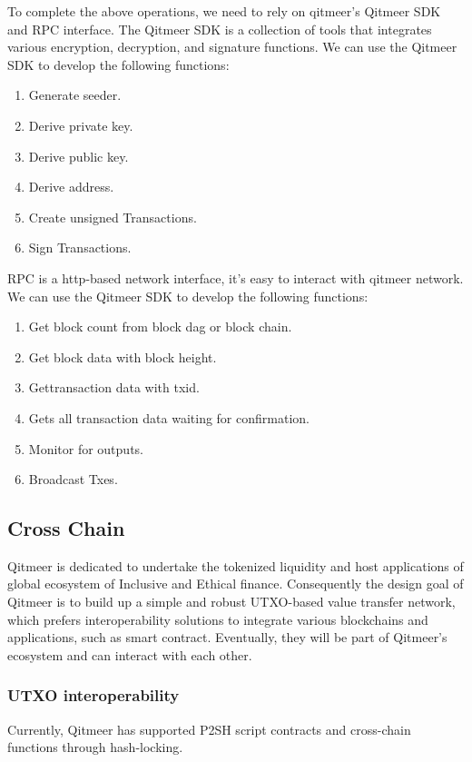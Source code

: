 \documentclass[a4paper,11pt]{article}
\begin{document}
   To complete the above operations, we need to rely on qitmeer's Qitmeer SDK and RPC interface.
   The Qitmeer SDK is a collection of tools that integrates various encryption, decryption, and signature functions. We can use the Qitmeer SDK to develop the following functions:

   \begin{enumerate}
     \item Generate seeder.
     \item Derive private key.
     \item Derive public key.
     \item Derive address.
     \item Create unsigned Transactions.
	 \item Sign Transactions.
   \end{enumerate}

   RPC is a http-based network interface, it’s easy to interact with qitmeer network. We can use the Qitmeer SDK to develop the following functions:

   \begin{enumerate}
    \item  Get block count from block dag or block chain.
    \item Get block data with block height.
    \item  Gettransaction data with txid.
    \item  Gets all transaction data waiting for confirmation.
    \item  Monitor for outputs.
    \item  Broadcast Txes.
   \end{enumerate}


\subsection{Cross Chain}
Qitmeer is dedicated to undertake the tokenized liquidity and host applications of global ecosystem of Inclusive and Ethical finance. Consequently the design goal of Qitmeer is to build up a simple and robust UTXO-based value transfer network, which prefers interoperability solutions to integrate various blockchains and applications, such as smart contract. Eventually, they will be part of Qitmeer’s ecosystem and can interact with each other.

\subsubsection{UTXO interoperability}
Currently, Qitmeer has supported P2SH script contracts and cross-chain functions through hash-locking.
\end{document}
